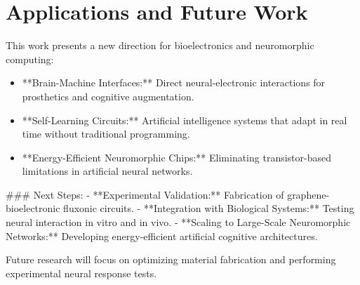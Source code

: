 \documentclass{article}
\begin{document}
\section{Applications and Future Work}
This work presents a new direction for bioelectronics and neuromorphic computing:
\begin{itemize}
    \item **Brain-Machine Interfaces:** Direct neural-electronic interactions for prosthetics and cognitive augmentation.
    \item **Self-Learning Circuits:** Artificial intelligence systems that adapt in real time without traditional programming.
    \item **Energy-Efficient Neuromorphic Chips:** Eliminating transistor-based limitations in artificial neural networks.
\end{itemize}

### Next Steps:
- **Experimental Validation:** Fabrication of graphene-bioelectronic fluxonic circuits.
- **Integration with Biological Systems:** Testing neural interaction in vitro and in vivo.
- **Scaling to Large-Scale Neuromorphic Networks:** Developing energy-efficient artificial cognitive architectures.

Future research will focus on optimizing material fabrication and performing experimental neural response tests.
\end{document}
